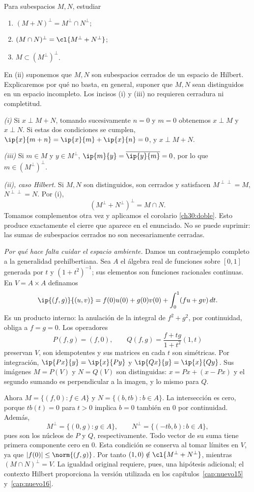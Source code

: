 \begin{ejercicio}\label{ej:lectura-30-4}
Para subespacios $M,N$, estudiar
\begin{enumerate}[label=(\roman*)]
 \item $(M+N)^{\perp}=M^{\perp}\cap N^{\perp}$;
 \item $(M\cap N)^{\perp}=\cl{M^{\perp}+N^{\perp}}$;
 \item $M\subset(M^{\perp})^{\perp}$.
\end{enumerate}
En (ii) suponemos que $M,N$ son subespacios cerrados de un espacio de Hilbert. Explicaremos por qué no basta, en general, suponer que $M,N$ sean distinguidos en un espacio incompleto. Los incisos (i) y (iii) no requieren cerradura ni completitud.
\end{ejercicio}
\begin{solucion}
\emph{(i)} Si $x\perp M+N$, tomando sucesivamente $n=0$ y $m=0$ obtenemos $x\perp M$ y $x\perp N$. Si estas dos condiciones se cumplen, $\ip{x}{m+n}=\ip{x}{m}+\ip{x}{n}=0$, y $x\perp M+N$.

\emph{(iii)} Si $m\in M$ y $y\in M^{\perp}$, $\ip{m}{y}=\overline{\ip{y}{m}}=0$, por lo que $m\in(M^{\perp})^{\perp}$.

\emph{(ii), caso Hilbert.} Si $M,N$ son distinguidos, son cerrados y satisfacen $M^{\perp\perp}=M$, $N^{\perp\perp}=N$. Por (i),
\[
 (M^{\perp}+N^{\perp})^{\perp}=M\cap N.
\]
Tomamos complementos otra vez y aplicamos el corolario \ref{ch30:doble}. Esto produce exactamente el cierre que aparece en el enunciado. No se puede suprimir: las sumas de subespacios cerrados no son necesariamente cerradas.

\emph{Por qué hace falta cuidar el espacio ambiente.} Damos un contraejemplo completo a la generalidad prehilbertiana. Sea $A$ el álgebra real de funciones sobre $[0,1]$ generada por $t$ y $(1+t^{2})^{-1}$; sus elementos son funciones racionales continuas. En $V=A\times A$ definamos
\[
 \ip{(f,g)}{(u,v)}=f(0)u(0)+g(0)v(0)
 +\int_0^1(fu+gv)\,dt.
\]
Es un producto interno: la anulación de la integral de $f^{2}+g^{2}$, por continuidad, obliga a $f=g=0$. Los operadores
\[
 P(f,g)=(f,0),\qquad
 Q(f,g)=\frac{f+tg}{1+t^{2}}(1,t)
\]
preservan $V$, son idempotentes y sus matrices en cada $t$ son simétricas. Por integración, $\ip{Px}{y}=\ip{x}{Py}$ y $\ip{Qx}{y}=\ip{x}{Qy}$. Sus imágenes $M=P(V)$ y $N=Q(V)$ son distinguidas: $x=Px+(x-Px)$ y el segundo sumando es perpendicular a la imagen, y lo mismo para $Q$.

Ahora $M=\{(f,0):f\in A\}$ y $N=\{(b,tb):b\in A\}$. La intersección es cero, porque $tb(t)=0$ para $t>0$ implica $b=0$ también en $0$ por continuidad. Además,
\[
 M^{\perp}=\{(0,g):g\in A\},\qquad
 N^{\perp}=\{(-tb,b):b\in A\},
\]
pues son los núcleos de $P$ y $Q$, respectivamente. Todo vector de su suma tiene primera componente cero en $0$. Esta condición se conserva al tomar límites en $V$, ya que $|f(0)|\leq\norm{(f,g)}$. Por tanto $(1,0)\notin\cl{M^{\perp}+N^{\perp}}$, mientras $(M\cap N)^{\perp}=V$. La igualdad original requiere, pues, una hipótesis adicional; el contexto Hilbert proporciona la versión utilizada en los capítulos~\ref{cap:nuevo15} y~\ref{cap:nuevo16}.
\end{solucion}

